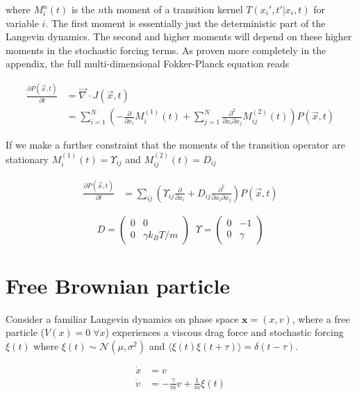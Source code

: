 where $M_{i}^{n}(t)$ is the $n$th moment of a transition kernel $T(x_{i}',t'|x_{i},t)$ for variable $i$. The first moment is essentially just the deterministic part of the Langevin dynamics. The second and higher moments will depend on these higher moments in the stochastic forcing terms. As proven more completely in the appendix, the full multi-dimensional Fokker-Planck equation reads

\begin{align}
\frac{\partial P(\vec{x},t)}{\partial t}  &= \vec{\nabla} \cdot J(\vec{x},t)\\
&= \sum_{i=1}^{N}\left(-\frac{\partial}{\partial x_{i}}M_{i}^{(1)}(t) + \sum_{j=1}^{N} \frac{\partial^{2}}{\partial x_{i}\partial x_{j}}M_{ij}^{(2)}(t)\right)P(\vec{x},t)
\end{align}

If we make a further constraint that the moments of the transition operator are stationary $M_{i}^{(1)}(t) = \Upsilon_{ij}$ and $M_{ij}^{(2)}(t) = D_{ij}$ 

\begin{align}
\frac{\partial P(\vec{x},t)}{\partial t}  &= \sum_{ij}\left(\Upsilon_{ij}\frac{\partial}{\partial x_{i}} + D_{ij}\frac{\partial^{2}}{\partial x_{i}\partial x_{j}}\right)P(\vec{x},t)
\end{align}

\begin{equation*}
D = \begin{pmatrix}0&0 \\ 0& \gamma k_{B}T/m \end{pmatrix}\;\;\Upsilon = \begin{pmatrix}0 & -1\\ 0 & \gamma\end{pmatrix}
\end{equation*}

\section{Free Brownian particle}

Consider a familiar Langevin dynamics on phase space $\bm{x} = (x,v)$, where a free particle ($V(x)=0\; \forall x$) experiences a viscous drag force and stochastic forcing $\xi(t)$ where $\xi(t)\sim\mathcal{N}(\mu,\sigma^{2})$ and $\langle \xi(t)\xi(t+\tau)\rangle = \delta(t-\tau)$. 

\begin{align*}
\dot{x} &= v\\
\dot{v} &= -\frac{\gamma}{m}v + \frac{1}{m}\xi(t)
\end{align*}


